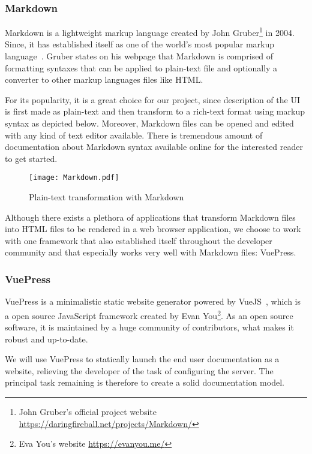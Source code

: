 \subsubsection{Markdown}\label{sec:MD}

Markdown is a lightweight markup language created by John Gruber\footnote{John Gruber's official project website \url{https://daringfireball.net/projects/Markdown/}} in 2004. Since, it has established itself as one of the world's most popular markup language~\cite{Markdown}. Gruber states on his webpage that Markdown is comprised of formatting syntaxes that can be applied to plain-text file and optionally a converter to other markup languages files like HTML.

For its popularity, it is a great choice for our project, since description of the UI is first made as plain-text and then transform to a rich-text format using markup syntax as depicted below. Moreover, Markdown files can be opened and edited with any kind of text editor available. There is tremendous amount of documentation about Markdown syntax available online for the interested reader to get started.

\begin{figure}[h]
    \centering
    \texttt{[image: Markdown.pdf]}
    \caption{Plain-text transformation with Markdown}
    \label{fig:Markdown}
\end{figure}

Although there exists a plethora of applications that transform Markdown files into HTML files to be rendered in a web browser application, we choose to work with one framework that also established itself throughout the developer community and that especially works very well with Markdown files: VuePress.

\subsubsection{VuePress}\label{sec:VP}

VuePress is a minimalistic static website generator powered by VueJS~\cite{vuepress}, which is a open source JavaScript framework created by Evan You\footnote{Eva You's website \url{https://evanyou.me/}}. As an open source software, it is maintained by a huge community of contributors, what makes it robust and up-to-date.

We will use VuePress to statically launch the end user documentation as a website, relieving the developer of the task of configuring the server. The principal task remaining is therefore to create a solid documentation model.

